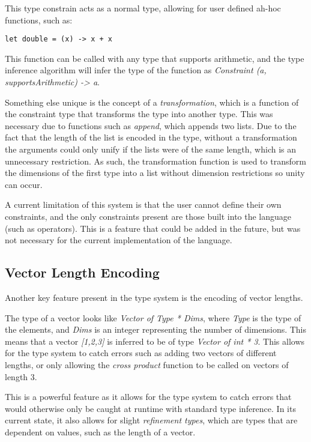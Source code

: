 This type constrain acts as a normal type, allowing for user defined ah-hoc functions, such as:

\begin{verbatim}
let double = (x) -> x + x
\end{verbatim}

This function can be called with any type that supports arithmetic, and the type inference algorithm will infer the
type of the function as \textit{Constraint (a, supportsArithmetic) -> a}.

Something else unique is the concept of a \textit{transformation}, which is a function of the constraint type that
transforms the type into another type.
This was necessary due to functions such as \textit{append}, which appends two lists.
Due to the fact that the length of the list is encoded in the type, without a transformation the arguments could 
only unify if the lists were of the same length, which is an unnecessary restriction.
As such, the transformation function is used to transform the dimensions of the first type into a list without 
dimension restrictions so unity can occur.

A current limitation of this system is that the user cannot define their own constraints, and the only constraints 
present are those built into the language (such as operators).
This is a feature that could be added in the future, but was not necessary for the current implementation of the
language.

\subsection{Vector Length Encoding}\label{subsec:vector-length-enc}

Another key feature present in the type system is the encoding of vector lengths.

The type of a vector looks like \textit{Vector of Type * Dims}, where \textit{Type} is the type of the elements, and \textit{Dims} is an integer representing the number of dimensions.
This means that a vector \textit{[1,2,3]} is inferred to be of type \textit{Vector of int * 3}.
This allows for the type system to catch errors such as adding two vectors of different lengths, or only allowing the \textit{cross product} 
function to be called on vectors of length 3.

This is a powerful feature as it allows for the type system to catch errors that would otherwise only be caught at 
runtime with standard type inference.
In its current state, it also allows for slight \textit{refinement types}\citep{freeman1991refinement}, which are types that are dependent on values, such as the length of a vector.

